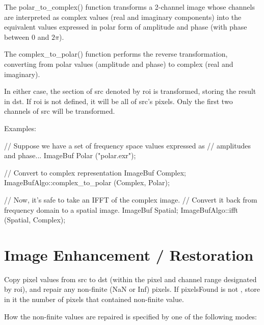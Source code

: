 The {\cf polar_to_complex()} function transforms a 2-channel image whose
channels are interpreted as complex values (real and imaginary components)
into the equivalent values expressed in polar form of amplitude and phase
(with phase between $0$ and $2\pi$).

The {\cf complex_to_polar()} function performs the reverse transformation,
converting from  polar values (amplitude and phase) to complex (real and
imaginary).

In either case,  the section of {\cf src} denoted by {\cf roi} is
transformed, storing the result in {\cf dst}. If {\cf roi} is not defined,
it will be all of {\cf src}'s pixels.  Only the first two channels of {\cf
src} will be transformed.

\smallskip
\noindent Examples:
\begin{code}
    // Suppose we have a set of frequency space values expressed as
    // amplitudes and phase...
    ImageBuf Polar ("polar.exr");

    // Convert to complex representation
    ImageBuf Complex;
    ImageBufAlgo::complex_to_polar (Complex, Polar);

    // Now, it's safe to take an IFFT of the complex image.
    // Convert it back from frequency domain to a spatial image.
    ImageBuf Spatial;
    ImageBufAlgo::ifft (Spatial, Complex);
\end{code}
\apiend



\section{Image Enhancement / Restoration}
\label{sec:iba:enhance}

 

Copy pixel values from {\cf src} to {\cf dst} (within the pixel and channel
range designated by {\cf roi}), and repair any non-finite ({\cf NaN} or {\cf
Inf}) pixels.  If {\cf pixelsFound} is not \NULL, store in it the number of
pixels that contained non-finite value.

How the non-finite values are repaired is specified by one of the
following modes:

